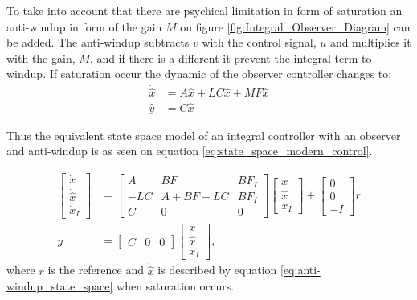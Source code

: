 \documentclass[../../main.tex]{subfiles}
\begin{document}
To take into account that there are psychical limitation in form of saturation an anti-windup in form of the gain $M$ on figure \ref{fig:Integral_Observer_Diagram} can be added. The anti-windup subtracts $v$ with the control signal, $u$ and multiplies it with the gain, $M$. and if there is a different it prevent the integral term to windup. 
If saturation occur the dynamic of the observer controller changes to:
\begin{equation}\label{eq:anti-windup_state_space}
    \begin{split}
        \Dot{\hat{x}}&=A\hat{x}+LC\hat{x}+MF\hat{x}\\
        \hat{y}&=C\hat{x}
    \end{split}
\end{equation}

Thus the equivalent state space model of an integral controller with an observer and anti-windup is as seen on equation \ref{eq:state_space_modern_control}.

\begin{equation}\label{eq:state_space_modern_control}
\begin{split}
\begin{bmatrix}
        \dot{x} \\
        \dot{\hat{x}}\\
        \dot{x}_I
    \end{bmatrix} &=
    \begin{bmatrix}
        A & BF & BF_I \\
        -LC & A+BF+LC & BF_I \\
        C & 0 & 0
    \end{bmatrix}
    \begin{bmatrix}
        x \\
        \hat{x} \\
        x_I
    \end{bmatrix}
    + 
    \begin{bmatrix}
    0\\
    0\\
    -I
    \end{bmatrix}
    r \\
    y &= \begin{bmatrix}
        C & 0 & 0
    \end{bmatrix}     
    \begin{bmatrix}
        x \\
        \hat{x} \\
        x_I
    \end{bmatrix}, 
    \end{split}
\end{equation}
where $r$ is the reference and $\Dot{\hat{x}}$ is described by equation \ref{eq:anti-windup_state_space} when saturation occurs.
\end{document}
